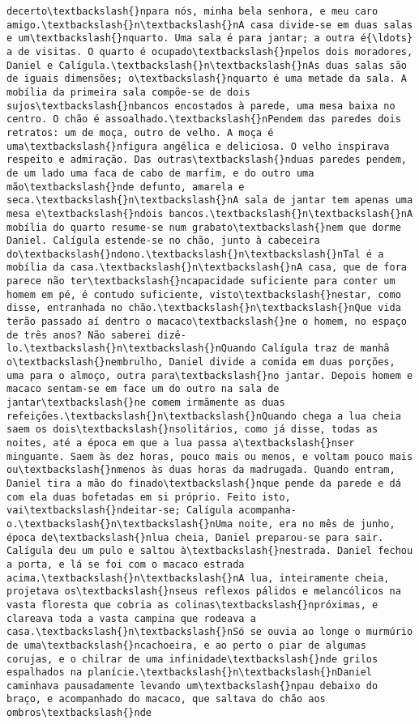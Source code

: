 \begin{Verbatim}[commandchars=\\\{\}]
decerto\textbackslash{}npara nós, minha bela senhora, e meu caro amigo.\textbackslash{}n\textbackslash{}nA casa divide-se em duas salas e um\textbackslash{}nquarto. Uma sala é para jantar; a outra é{\ldots} a de visitas. O quarto é ocupado\textbackslash{}npelos dois moradores, Daniel e Calígula.\textbackslash{}n\textbackslash{}nAs duas salas são de iguais dimensões; o\textbackslash{}nquarto é uma metade da sala. A mobília da primeira sala compõe-se de dois sujos\textbackslash{}nbancos encostados à parede, uma mesa baixa no centro. O chão é assoalhado.\textbackslash{}nPendem das paredes dois retratos: um de moça, outro de velho. A moça é uma\textbackslash{}nfigura angélica e deliciosa. O velho inspirava respeito e admiração. Das outras\textbackslash{}nduas paredes pendem, de um lado uma faca de cabo de marfim, e do outro uma mão\textbackslash{}nde defunto, amarela e seca.\textbackslash{}n\textbackslash{}nA sala de jantar tem apenas uma mesa e\textbackslash{}ndois bancos.\textbackslash{}n\textbackslash{}nA mobília do quarto resume-se num grabato\textbackslash{}nem que dorme Daniel. Calígula estende-se no chão, junto à cabeceira do\textbackslash{}ndono.\textbackslash{}n\textbackslash{}nTal é a mobília da casa.\textbackslash{}n\textbackslash{}nA casa, que de fora parece não ter\textbackslash{}ncapacidade suficiente para conter um homem em pé, é contudo suficiente, visto\textbackslash{}nestar, como disse, entranhada no chão.\textbackslash{}n\textbackslash{}nQue vida terão passado aí dentro o macaco\textbackslash{}ne o homem, no espaço de três anos? Não saberei dizê-lo.\textbackslash{}n\textbackslash{}nQuando Calígula traz de manhã o\textbackslash{}nembrulho, Daniel divide a comida em duas porções, uma para o almoço, outra para\textbackslash{}no jantar. Depois homem e macaco sentam-se em face um do outro na sala de jantar\textbackslash{}ne comem irmãmente as duas refeições.\textbackslash{}n\textbackslash{}nQuando chega a lua cheia saem os dois\textbackslash{}nsolitários, como já disse, todas as noites, até a época em que a lua passa a\textbackslash{}nser minguante. Saem às dez horas, pouco mais ou menos, e voltam pouco mais ou\textbackslash{}nmenos às duas horas da madrugada. Quando entram, Daniel tira a mão do finado\textbackslash{}nque pende da parede e dá com ela duas bofetadas em si próprio. Feito isto, vai\textbackslash{}ndeitar-se; Calígula acompanha-o.\textbackslash{}n\textbackslash{}nUma noite, era no mês de junho, época de\textbackslash{}nlua cheia, Daniel preparou-se para sair. Calígula deu um pulo e saltou à\textbackslash{}nestrada. Daniel fechou a porta, e lá se foi com o macaco estrada acima.\textbackslash{}n\textbackslash{}nA lua, inteiramente cheia, projetava os\textbackslash{}nseus reflexos pálidos e melancólicos na vasta floresta que cobria as colinas\textbackslash{}npróximas, e clareava toda a vasta campina que rodeava a casa.\textbackslash{}n\textbackslash{}nSó se ouvia ao longe o murmúrio de uma\textbackslash{}ncachoeira, e ao perto o piar de algumas corujas, e o chilrar de uma infinidade\textbackslash{}nde grilos espalhados na planície.\textbackslash{}n\textbackslash{}nDaniel caminhava pausadamente levando um\textbackslash{}npau debaixo do braço, e acompanhado do macaco, que saltava do chão aos ombros\textbackslash{}nde 
\end{Verbatim}
